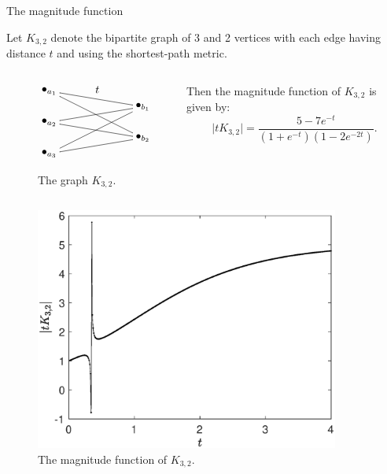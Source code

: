 \documentclass[12pt,mathserif]{beamer}
\begin{document}
\begin{frame}[allowframebreaks]{The magnitude function}
\framebreak

\begin{example}
Let $K_{3,2}$ denote the bipartite graph of 3 and 2 vertices with each edge having distance $t$ and using the shortest-path metric.
\begin{columns}
\begin{column}{0.47\textwidth}
\begin{figure}
\begin{equation*}
\begin{xy}
(0,0)*+{\bullet_{a_1}}="a1";
(0,-10)*+{\bullet_{a_2}}="a2";
(0,-20)*+{\bullet_{a_3}}="a3";
(30,-5)*+{\bullet_{b_1}}="b1";
(30,-15)*+{\bullet_{b_2}}="b2";
{\ar@{-} "a1";"b1"}?*!/_3mm/{t};
{\ar@{-} "a2";"b1"};
{\ar@{-} "a3";"b1"};
{\ar@{-} "a1";"b2"};
{\ar@{-} "a2";"b2"};
{\ar@{-} "a3";"b2"};
\end{xy}
\end{equation*}
\caption{\label{fig:K32}The graph $K_{3,2}$.}
\end{figure}
\end{column}
\begin{column}{0.47\textwidth}
Then the magnitude function of $K_{3,2}$ is given by:
\begin{equation*}
\vert tK_{3,2} \vert = \frac{5-7e^{-t}}{(1+e^{-t})(1-2e^{-2t})}.
\end{equation*}
\end{column}
\end{columns}
\end{example}
\end{frame}

\begin{frame}[plain]
\begin{figure}
\includegraphics[width=10cm]{K32.eps}\caption{\label{fig:K32magfun}The magnitude function of $K_{3,2}$.}
\end{figure}
\end{frame}
\end{document}
